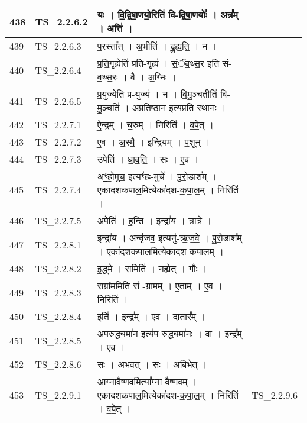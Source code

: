 \documentclass[17pt]{extarticle}
\begin{document}
\begin{longtable}{||p{0.4in}||p{0.9in}||p{4.0in}||p{0.9in}||}
        \hline
            438 & TS\_2.2.6.2 & यः   ।   वि॒द्वि॒षा॒णयो॒रिति॑ वि{-}द्वि॒षा॒णयोः᳚   ।   अन्न᳚म्   ।   अत्ति॑   ।    &      \\
        \hline
            439 & TS\_2.2.6.3 & प॒रस्ता᳚त्   ।   अ॒भीति॑   ।   द्रु॒ह्य॒ति॒   ।   न   ।    &      \\
        \hline
            440 & TS\_2.2.6.4 & प्र॒ति॒गृह्येति॑ प्रति{-}गृह्य॑   ।   सं॒ॅव॒थ्स॒र इति॑ सं{-}व॒थ्स॒रः   ।   वै   ।   अ॒ग्निः   ।    &      \\
        \hline
            441 & TS\_2.2.6.5 & प्र॒युज्येति॑ प्र{-}युज्य॑   ।   न   ।   वि॒मु॒ञ्चतीति॑ वि{-}मु॒ञ्चति॑   ।   अ॒प्र॒ति॒ष्ठा॒न इत्य॑प्रति{-}स्था॒नः   ।    &      \\
        \hline
            442 & TS\_2.2.7.1 & ऐ॒न्द्रम्   ।   च॒रुम्   ।   निरिति॑   ।   व॒पे॒त्   ।    &      \\
        \hline
            443 & TS\_2.2.7.2 & ए॒व   ।   अ॒स्मै॒   ।   इ॒न्द्रि॒यम्   ।   प॒शून्   ।    &      \\
        \hline
            444 & TS\_2.2.7.3 & उपेति॑   ।   धा॒व॒ति॒   ।   सः   ।   ए॒व   ।    &      \\
        \hline
            445 & TS\_2.2.7.4 & अꣳ॒॒हो॒मुच॒ इत्यꣳ॑हः{-}मुचे᳚   ।   पु॒रो॒डाश᳚म्   ।   एका॑दशकपाल॒मित्येका॑दश{-}क॒पा॒ल॒म्   ।   निरिति॑   ।    &      \\
        \hline
            446 & TS\_2.2.7.5 & अपेति॑   ।   ह॒न्ति॒   ।   इन्द्रा॑य   ।   त्रा॒त्रे   ।    &      \\
        \hline
            447 & TS\_2.2.8.1 & इ॒न्द्रा॑य   ।   अन्वृ॑जव॒ इत्यनु॑{-}ऋ॒ज॒वे॒   ।   पु॒रो॒डाश᳚म्   ।   एका॑दशकपाल॒मित्येका॑दश{-}क॒पा॒ल॒म्   ।    &      \\
        \hline
            448 & TS\_2.2.8.2 & इ॒द्ध्मे   ।   समिति॑   ।   न॒ह्ये॒त्   ।   गौः   ।    &      \\
        \hline
            449 & TS\_2.2.8.3 & स॒ग्रां॒ममिति॑ सं {-}ग्रा॒मम्   ।   ए॒ताम्   ।   ए॒व   ।   निरिति॑   ।    &      \\
        \hline
            450 & TS\_2.2.8.4 & इति॑   ।   इन्द्र᳚म्   ।   ए॒व   ।   दा॒तार᳚म्   ।    &      \\
        \hline
            451 & TS\_2.2.8.5 & अ॒प॒रु॒द्ध्यमा॑न॒ इत्य॑प{-}रु॒द्ध्यमा॑नः   ।   वा॒   ।   इन्द्र᳚म्   ।   ए॒व   ।    &      \\
        \hline
            452 & TS\_2.2.8.6 & सः   ।   अ॒भ॒व॒त्   ।   सः   ।   अ॒बि॒भे॒त्   ।    &      \\
        \hline
            453 & TS\_2.2.9.1 & आ॒ग्ना॒वै॒ष्ण॒वमित्या᳚ग्ना{-}वै॒ष्ण॒वम्   ।   एका॑दशकपाल॒मित्येका॑दश{-}क॒पा॒ल॒म्   ।   निरिति॑   ।   व॒पे॒त्   ।    &  TS\_2.2.9.6       \\

\end{longtable}
\end{document}
